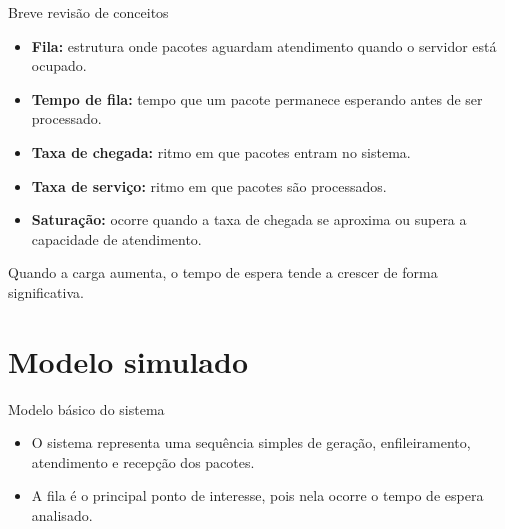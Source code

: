 \documentclass[aspectratio=169]{beamer}
\begin{document}
\begin{frame}{Breve revisão de conceitos}
\begin{itemize}
    \item \textbf{Fila:} estrutura onde pacotes aguardam atendimento quando o servidor está ocupado.
    \item \textbf{Tempo de fila:} tempo que um pacote permanece esperando antes de ser processado.
    \item \textbf{Taxa de chegada:} ritmo em que pacotes entram no sistema.
    \item \textbf{Taxa de serviço:} ritmo em que pacotes são processados.
    \item \textbf{Saturação:} ocorre quando a taxa de chegada se aproxima ou supera a capacidade de atendimento.
\end{itemize}

\begin{informacao}
Quando a carga aumenta, o tempo de espera tende a crescer de forma significativa.
\end{informacao}
\end{frame}

\section{Modelo simulado}

\begin{frame}{Modelo básico do sistema}
\centering
{}

\vspace{0.8cm}

\begin{itemize}
    \item O sistema representa uma sequência simples de geração, enfileiramento, atendimento e recepção dos pacotes.
    \item A fila é o principal ponto de interesse, pois nela ocorre o tempo de espera analisado.
\end{itemize}
\end{frame}
\end{document}
